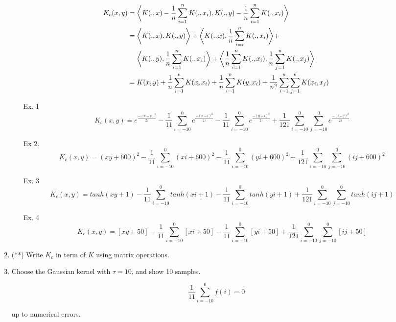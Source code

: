 \documentclass{article}
\begin{document}
\begin{enumerate}
        \begin{equation} 
            \begin{aligned} 
                K_c(x,y) &= \bigg \langle K(.,x)- \frac{1}{n}\sum_{i=1}^n K(.,x_i), K(.,y)-\frac{1}{n}\sum_{i=1}^n K(.,x_i) \bigg \rangle \notag \\
                &= \bigg \langle K(.,x), K(.,y) \bigg \rangle + \bigg \langle K(.,x), \frac{1}{n} \sum_{i=i}^n K(.,x_i) \bigg \rangle + \\ 
                &\ \ \ \ \bigg \langle K(.,y), \frac{1}{n}\sum_{i=1}^{n} K(.,x_i) \bigg \rangle + 
                \bigg \langle \frac{1}{n} \sum_{i=1}^{n} K(.,x_i), \frac{1}{n}\sum_{j=1}^{n} K(.,x_j) \bigg \rangle \\ 
                & = K(x,y) + \frac{1}{n}\sum_{i=1}^{n}K(x,x_i) + \frac{1}{n} \sum_{i=1}^{n} K(y,x_i) + 
                \frac{1}{n^2} \sum_{i=1}^{n} \sum_{j=1}^{n} K(x_i, x_j) 
            \end{aligned} 
        \end{equation}

        \begin{enumerate}
            \item[Ex. 1] 
                \[K_c(x,y) = e^{\frac{-(x-y)^2}{2\tau}} - \frac{1}{11}\sum_{i=-10}^{0} e^{\frac{-(x-i)^2}{2\tau}}
                - \frac{1}{11}\sum_{i=-10}^{0} e^{\frac{-(y-i)^2}{2\tau}} + \frac{1}{121}\sum_{i=-10}^0\sum_{j=-10}^0 e^{\frac{-(i-j)^2}{2\tau}}\]
            \item[Ex 2.] 
                \[K_c(x,y) = (x y + 600)^2 - \frac{1}{11}\sum_{i=-10}^{0} (x i + 600)^2
                - \frac{1}{11}\sum_{i=-10}^{0} (y i + 600)^2 + \frac{1}{121}\sum_{i=-10}^0\sum_{j=-10}^0 (i j + 600)^2\]
            \item[Ex. 3] 
                \[K_c(x,y) = tanh(xy+1) - \frac{1}{11}\sum_{i=-10}^{0} tanh(xi+1)
                - \frac{1}{11}\sum_{i=-10}^{0} tanh(yi+1) + \frac{1}{121}\sum_{i=-10}^0\sum_{j=-10}^0 tanh(ij+1)\]
            \item[Ex. 4] 
                \[K_c(x,y) = [xy+50] - \frac{1}{11}\sum_{i=-10}^{0} [xi+50]
                - \frac{1}{11}\sum_{i=-10}^{0} [yi+50] + \frac{1}{121}\sum_{i=-10}^0\sum_{j=-10}^0 [ij+50]\]
        \end{enumerate} 

    \item (**) Write $K_c$ in term of $K$ using matrix operations. 
    


    \item Choose the Gaussian kernel with $\tau=10$, and show 10 samples. 
        
        \begin{equation}
            \frac{1}{11}\sum_{i=-10}^0 f(i)=0
        \end{equation}
        
        up to numerical errors.  



\end{enumerate}
\end{document}
